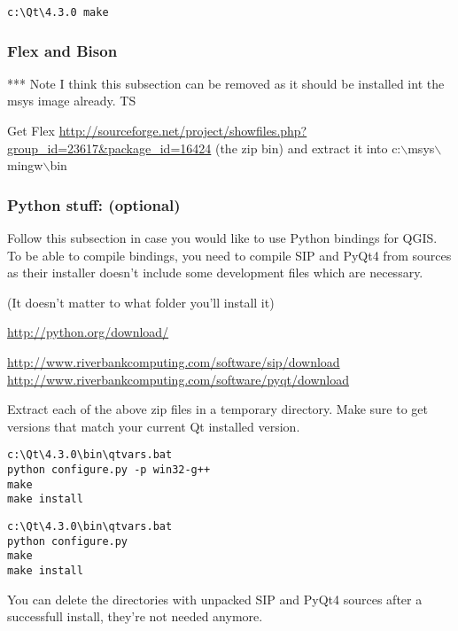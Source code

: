 \begin{verbatim}
c:\Qt\4.3.0 make 
\end{verbatim}

\hypertarget{toc7}{}
\subsubsection{Flex and Bison}
*** Note I think this subsection can be removed as it should be installed int the
msys image already. TS

Get Flex
\url{http://sourceforge.net/project/showfiles.php?group\_id=23617\&package\_id=16424}
(the zip bin) and extract it into c:$\backslash$msys$\backslash$mingw$\backslash$bin

\hypertarget{toc8}{}
\subsubsection{Python stuff: (optional)}
Follow this subsection in case you would like to use Python bindings for QGIS.  To
be able to compile bindings, you need to compile SIP and PyQt4 from sources as
their installer doesn't include some development files which are necessary.

\hypertarget{toc9}{}
(It doesn't matter to what folder you'll install it)

\url{http://python.org/download/}

\hypertarget{toc10}{}
\url{http://www.riverbankcomputing.com/software/sip/download}
\url{http://www.riverbankcomputing.com/software/pyqt/download}

Extract each of the above zip files in a temporary directory. Make sure
to get versions that match your current Qt installed version.

\hypertarget{toc11}{}
\begin{verbatim}
c:\Qt\4.3.0\bin\qtvars.bat 
python configure.py -p win32-g++ 
make 
make install 
\end{verbatim}

\hypertarget{toc12}{}
\begin{verbatim}
c:\Qt\4.3.0\bin\qtvars.bat 
python configure.py 
make 
make install 
\end{verbatim}

\hypertarget{toc13}{}
You can delete the directories with unpacked SIP and PyQt4 sources after a
successfull install, they're not needed anymore.

